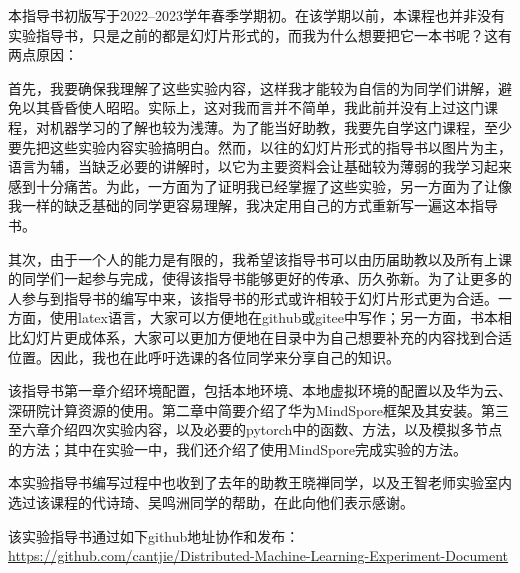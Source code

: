 

\hspace{2em}本指导书初版写于2022--2023学年春季学期初。在该学期以前，本课程也并非没有实验指导书，只是之前的都是幻灯片形式的，而我为什么想要把它一本书呢？这有两点原因：

\hspace{2em}首先，我要确保我理解了这些实验内容，这样我才能较为自信的为同学们讲解，避免以其昏昏使人昭昭。实际上，这对我而言并不简单，我此前并没有上过这门课程，对机器学习的了解也较为浅薄。为了能当好助教，我要先自学这门课程，至少要先把这些实验内容实验搞明白。然而，以往的幻灯片形式的指导书以图片为主，语言为辅，当缺乏必要的讲解时，以它为主要资料会让基础较为薄弱的我学习起来感到十分痛苦。为此，一方面为了证明我已经掌握了这些实验，另一方面为了让像我一样的缺乏基础的同学更容易理解，我决定用自己的方式重新写一遍这本指导书。

\hspace{2em}其次，由于一个人的能力是有限的，我希望该指导书可以由历届助教以及所有上课的同学们一起参与完成，使得该指导书能够更好的传承、历久弥新。为了让更多的人参与到指导书的编写中来，该指导书的形式或许相较于幻灯片形式更为合适。一方面，使用latex语言，大家可以方便地在github或gitee中写作；另一方面，书本相比幻灯片更成体系，大家可以更加方便地在目录中为自己想要补充的内容找到合适位置。因此，我也在此呼吁选课的各位同学来分享自己的知识。


\hspace{2em}该指导书第一章介绍环境配置，包括本地环境、本地虚拟环境的配置以及华为云、深研院计算资源的使用。第二章中简要介绍了华为MindSpore框架及其安装。第三至六章介绍四次实验内容，以及必要的pytorch中的函数、方法，以及模拟多节点的方法；其中在实验一中，我们还介绍了使用MindSpore完成实验的方法。

\hspace{2em}本实验指导书编写过程中也收到了去年的助教王晓禅同学，以及王智老师实验室内选过该课程的代诗琦、吴鸣洲同学的帮助，在此向他们表示感谢。

\hspace{2em}该实验指导书通过如下github地址协作和发布：\url{https://github.com/cantjie/Distributed-Machine-Learning-Experiment-Document}


